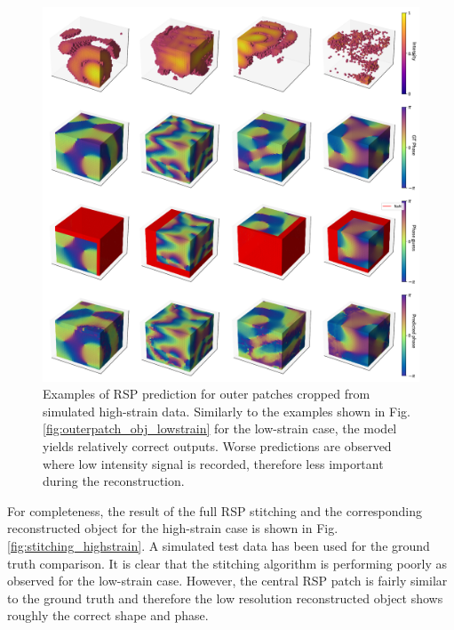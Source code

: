 \begin{figure}[H]
    \centering
    \includegraphics[width=\textwidth]{figures/Phasing/outer_patches_3D_highstrain.pdf}
    \caption{Examples of RSP prediction for outer patches cropped from simulated high-strain data. Similarly to 
        the examples shown in Fig. \ref{fig:outerpatch_obj_lowstrain} for the low-strain case, the model yields relatively 
        correct outputs. Worse predictions are observed where low intensity signal is recorded, therefore less important 
        during the reconstruction. }

    \label{fig:outer_highstrain}
\end{figure}
For completeness, the result of the full RSP stitching and the corresponding reconstructed object for 
the high-strain case is shown in Fig.\ref{fig:stitching_highstrain}. A simulated test data has been used for the ground truth comparison. It is clear that the 
stitching algorithm is performing poorly as observed for the low-strain case. However, the central RSP patch is fairly 
similar to the ground truth and therefore the low resolution reconstructed object shows roughly the correct shape and 
phase. 

